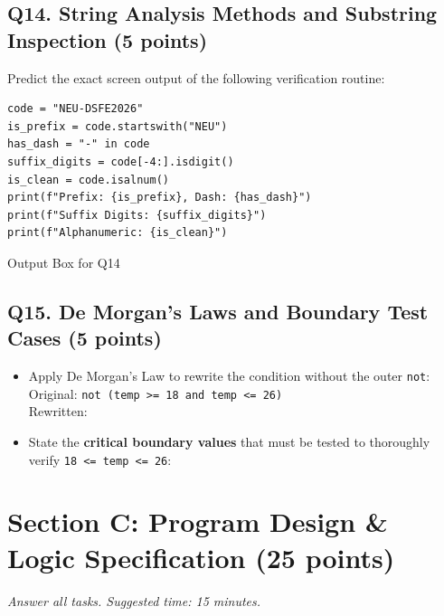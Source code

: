\documentclass[11pt,a4paper]{article}
\begin{document}
\subsection*{Q14. String Analysis Methods and Substring Inspection (5 points)}
Predict the exact screen output of the following verification routine:

\begin{lstlisting}
code = "NEU-DSFE2026"
is_prefix = code.startswith("NEU")
has_dash = "-" in code
suffix_digits = code[-4:].isdigit()
is_clean = code.isalnum()
print(f"Prefix: {is_prefix}, Dash: {has_dash}")
print(f"Suffix Digits: {suffix_digits}")
print(f"Alphanumeric: {is_clean}")
\end{lstlisting}

\begin{answerbox}[height=2.35cm]{Output Box for Q14}
\end{answerbox}

\subsection*{Q15. De Morgan's Laws and Boundary Test Cases (5 points)}
\begin{itemize}[leftmargin=2em]
  \item Apply De Morgan's Law to rewrite the condition without the outer \texttt{not}:\\
  Original: \texttt{not (temp >= 18 and temp <= 26)}\\
  Rewritten: \underline{\hspace{10cm}}
  \item State the \textbf{critical boundary values} that must be tested to thoroughly verify \texttt{18 <= temp <= 26}: \hrulefill
\end{itemize}

\newpage


\section*{Section C: Program Design \& Logic Specification \hfill \normalsize\normalfont(25 points)}
\textit{Answer all tasks. Suggested time: 15 minutes.}
\end{document}
